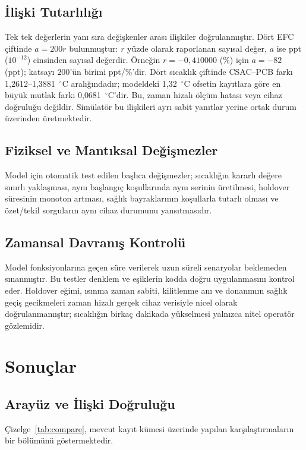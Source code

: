 \documentclass[9pt,twocolumn,a4paper]{extarticle}
\begin{document}
\subsection{İlişki Tutarlılığı}
Tek tek değerlerin yanı sıra değişkenler arası ilişkiler doğrulanmıştır. Dört EFC çiftinde $a=200r$ bulunmuştur: $r$ yüzde olarak raporlanan sayısal değer, $a$ ise ppt ($10^{-12}$) cinsinden sayısal değerdir. Örneğin $r=-0{,}410000$ (\%) için $a=-82$ (ppt); katsayı $200$'ün birimi ppt/\%'dir. Dört sıcaklık çiftinde CSAC--PCB farkı 1{,}2612--1{,}3881~$^{\circ}$C aralığındadır; modeldeki 1{,}32~$^{\circ}$C ofsetin kayıtlara göre en büyük mutlak farkı 0{,}0681~$^{\circ}$C'dir. Bu, zaman hizalı ölçüm hatası veya cihaz doğruluğu değildir. Simülatör bu ilişkileri ayrı sabit yanıtlar yerine ortak durum üzerinden üretmektedir.

\subsection{Fiziksel ve Mantıksal Değişmezler}
Model için otomatik test edilen başlıca değişmezler; sıcaklığın kararlı değere sınırlı yaklaşması, aynı başlangıç koşullarında aynı serinin üretilmesi, holdover süresinin monoton artması, sağlık bayraklarının koşullarla tutarlı olması ve özet/tekil sorguların aynı cihaz durumunu yansıtmasıdır.

\subsection{Zamansal Davranış Kontrolü}
Model fonksiyonlarına geçen süre verilerek uzun süreli senaryolar beklemeden sınanmıştır. Bu testler denklem ve eşiklerin kodda doğru uygulanmasını kontrol eder. Holdover eğimi, ısınma zaman sabiti, kilitlenme anı ve donanımın sağlık geçiş gecikmeleri zaman hizalı gerçek cihaz verisiyle nicel olarak doğrulanmamıştır; sıcaklığın birkaç dakikada yükselmesi yalnızca nitel operatör gözlemidir.

\section{Sonuçlar}
\subsection{Arayüz ve İlişki Doğruluğu}
Çizelge~\ref{tab:compare}, mevcut kayıt kümesi üzerinde yapılan karşılaştırmaların bir bölümünü göstermektedir.
\end{document}
